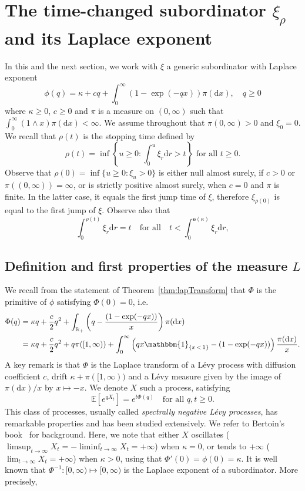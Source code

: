 \documentclass[10pt]{amsart}
\theoremstyle{definition}
\numberwithin{equation}{section}
\newcommand{\R}{\mathbb{R}}
\newcommand{\bbE}{\mathbb{E}}
\newcommand{\dd}{\mathrm{d}}
\newcommand{\bfe}{\mathbf{e}}
\newcommand{\ind}[1]{\mathbbm{1}_{\left\{#1\right\}}}
\begin{document}
\section{The time-changed subordinator \texorpdfstring{$\xi_{\rho}$}{xiRho} and its Laplace exponent}\label{sec:Laplace}

In this and the next section, we work with $\xi$ a generic subordinator with Laplace exponent
\[
\phi(q)=\kappa+cq+\int_0^{\infty} \left(1-\exp(-qx)\right)\pi(\dd x), \quad q \geq 0
\]
where $\kappa \geq 0$, $c \geq 0$ and $\pi$ is a measure on $(0,\infty)$ such that $\int_0^{\infty} (1 \wedge x) \pi(\dd x)<\infty$. We assume throughout that $\pi(0,\infty)>0$ and $\xi_0=0$. We recall that $\rho(t)$ is the stopping time defined by
\begin{equation}\label{eq:time_change}
\rho(t)=\inf \left\{u \geq 0 : \int_0^u \xi_r \dd r >t \right\} \text{ for all }t\geq 0.
\end{equation}
Observe that $\rho(0) = \inf\{u \geq 0 : \xi_u > 0\}$ is either null almost surely, if $c > 0$ or $\pi((0,\infty)) = \infty$, or is strictly positive almost surely, when $c=0$ and $\pi$ is finite. In the latter case, it equals the first jump time of $\xi$, therefore $\xi_{\rho(0)}$ is equal to the first jump of $\xi$. Observe also that
\[
\int_0^{\rho(t)} \xi_r \dd r =t \quad \text{for all} \quad t <\int_0^{\bfe(\kappa)}\xi_r \dd r,
\]

\subsection{Definition and first properties of the measure \texorpdfstring{$L$}{L}}\label{sec:L}

We recall from the statement of Theorem~\ref{thm:lapTransform} that $\Phi$ is the primitive of $\phi$ satisfying $\Phi(0) = 0$, i.e.
\begin{align}\label{LK_Phi}
\Phi(q)&=\kappa q+\frac{c}{2}q^2+\int_{\R _+} \left(q-\frac{\left(1-\exp(-qx)\right)}{x}\right)\pi(\dd x) \\
\nonumber &= \kappa q+\frac{c}{2}q^2+ q \pi([1,\infty))+\int_0^{\infty} \left(qx \ind{x\,<\,1} -\left(1-\exp(-qx)\right)\right) \frac{\pi(\dd x)}{x}.
\end{align}
A key remark is that $\Phi$ is the Laplace transform of a Lévy process with diffusion coefficient $c$, drift $\kappa + \pi([1,\infty))$ and a Lévy measure given by the image of $\pi(\dd x)/x$ by $x \mapsto -x$. We denote $X$ such a process, satisfying
\begin{equation*}\label{def_X}
\bbE\left[e^{qX_t}\right]=e^{t \Phi(q)} \quad \text{for all } q,t \geq 0.
\end{equation*}
This class of processes, usually called \emph{spectrally negative Lévy processes}, has remarkable properties and has been studied extensively. We refer to Bertoin's book~\cite[Chapter~VII]{BLevy} for background. Here, we note that either $X$ oscillates ($\limsup_{t\rightarrow \infty} X_t=-\liminf_{t\rightarrow \infty} X_t=+\infty$) when $\kappa=0$, or tends to $+\infty$ ($\lim_{t\rightarrow \infty} X_t=+\infty$) when $\kappa>0$, using that $\Phi'(0)=\phi(0)=\kappa$. It is well known that $\Phi^{-1}:[0,\infty)\mapsto [0,\infty)$ is the Laplace exponent of a subordinator. More precisely,
\end{document}
